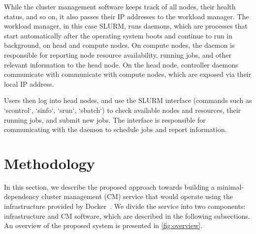 \documentclass[sigconf]{acmart}
\begin{document}
While the cluster management software keeps track of all nodes, their health status, and so on, it also passes their IP 
addresses to the workload manager.
The workload manager, in this case SLURM, runs daemons, which are processes that start automatically after 
the operating system boots and continue to run in background, on head and compute nodes.
On compute nodes, the daemon is responsible for reporting node resource availability, running jobs, and other relevant
information to the head node.
On the head node, controller daemons communicate with communicate with compute nodes, which are exposed via their local IP 
address.

Users then log into head nodes, and use the SLURM interface (commands such as `scontrol`, `sinfo`, `srun`, `sbatch`) to check
available nodes and resources, their running jobs, and submit new jobs.
The interface is responsible for communicating with the daemon to schedule jobs and report information.

\section{Methodology}

In this section, we describe the proposed approach towards building a minimal-dependency cluster management (CM) service that
would operate using the infrastructure provided by Docker~\cite{merkel2014docker}.
We divide the service into two components: infrastructure and CM software, which are described in the following subsections.
An overview of the proposed system is presented in \cref{fig:overview}.
\end{document}
